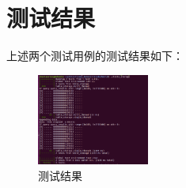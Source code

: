 \documentclass[bachelor]{thesis-uestc}
\begin{document}
\section{测试结果}
上述两个测试用例的测试结果如下：
\begin{figure}[htbp]
	\centering\includegraphics[height=3cm]{images/test_linux.png}
	\caption{测试结果}
	\label{fig:test_linux}
\end{figure}
\end{document}

